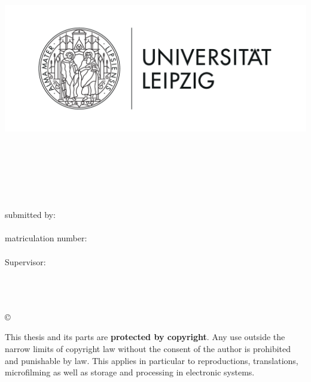 \thispagestyle{plain}
\begin{titlepage}

\begin{center}
\includegraphics[height=7cm]{Bilder/Uni-L.png}\\[2.5ex]

\institut\\
\fakultaet\\
\fachgebiet\\[6ex]

\textbf{\large\titel}\\[1.5ex]
\art\\[6ex]

\normalsize
submitted by:\\
\autor\\[1.5ex]
matriculation number:\\
\matrikelnr\\[1.5ex]
Supervisor:\\
\erstbetreuer\\
\zweitbetreuer\\
\drittbetreuer\\[1.0ex]
\end{center}


\begin{center}
\copyright\ \jahr\\[1.0ex]
\end{center}

\singlespacing
\small
\noindent This thesis and its parts are \textbf{protected by copyright}. Any use outside the narrow limits of copyright law without the consent of the author is prohibited and punishable by law. This applies in particular to reproductions, translations, microfilming as well as storage and processing in electronic systems.

\end{titlepage}
